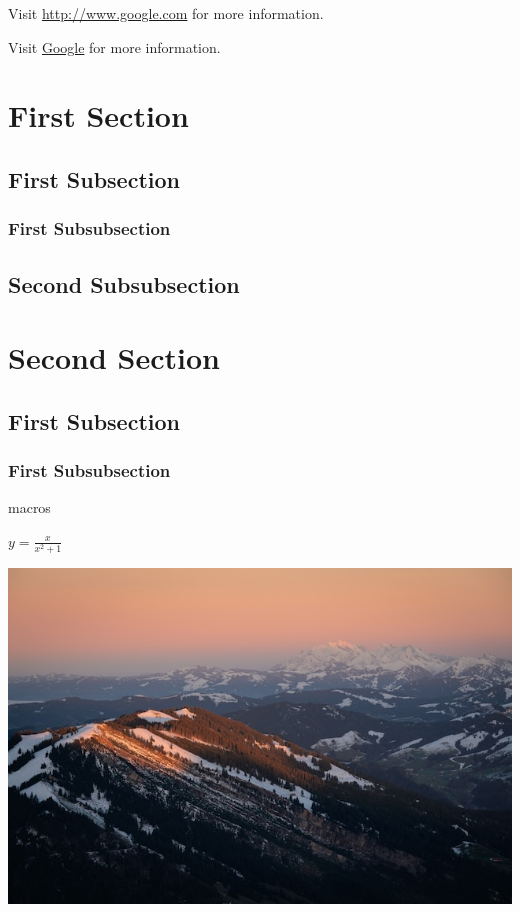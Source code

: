 \documentclass[10pt, letterpaper]{article}
\def\eq1{y=\frac{x}{x^2+1}} %
\begin{document}
Visit \url{http://www.google.com} for more information.

Visit \href{http://www.google.com}{Google} for more information.


\section{First Section}

\subsection{First Subsection}

\subsubsection{First Subsubsection}

\subsection{Second Subsubsection}

\section{Second Section}

\subsection{First Subsection}

\subsubsection*{First Subsubsection}


macros

$\eq1$


\includegraphics[scale=0.5]{1.jpg}
\end{document}

